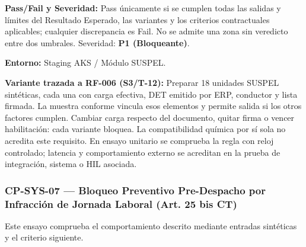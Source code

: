 \par\noindent\textbf{Pass/Fail y Severidad:} Pass únicamente si se cumplen todas las salidas y límites del Resultado Esperado, las variantes y los criterios contractuales aplicables; cualquier discrepancia es Fail. No se admite una zona sin veredicto entre dos umbrales. Severidad: \textbf{P1 (Bloqueante)}.\par
\par\noindent\textbf{Entorno:} Staging AKS / Módulo SUSPEL.\par







\par\noindent\textbf{Variante trazada a RF-006 (S3/T-12):} Preparar 18 unidades SUSPEL sintéticas, cada una con carga efectiva, DET emitido por ERP, conductor y lista firmada. La muestra conforme vincula esos elementos y permite salida si los otros factores cumplen. Cambiar carga respecto del documento, quitar firma o vencer habilitación: cada variante bloquea. La compatibilidad química por sí sola no acredita este requisito. En ensayo unitario se comprueba la regla con reloj controlado; latencia y comportamiento externo se acreditan en la prueba de integración, sistema o HIL asociada.\par
\subsubsection*{CP-SYS-07 — Bloqueo Preventivo Pre-Despacho por Infracción de Jornada Laboral (Art. 25 bis CT)}\label{sec:9-cp-sys-07}
Este ensayo comprueba el comportamiento descrito mediante entradas sintéticas y el criterio siguiente.

